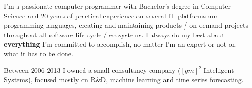 
\begin{cvparagraph}
I’m a passionate computer programmer with Bachelor’s degree in Computer Science and 20 years
of practical experience on several IT platforms and programming languages, creating and maintaining
products / on-demand projects throughout all software life cycle / ecosystems.
I always do my best about \textbf{everything} I’m committed to accomplish, no matter I’m an expert
or not on what it has to be done.

Between 2006-2013 I owned a small consultancy company
($[gm]^2$ Intelligent Systems), focused mostly on R\&D, machine learning and time series forecasting.

\end{cvparagraph}
